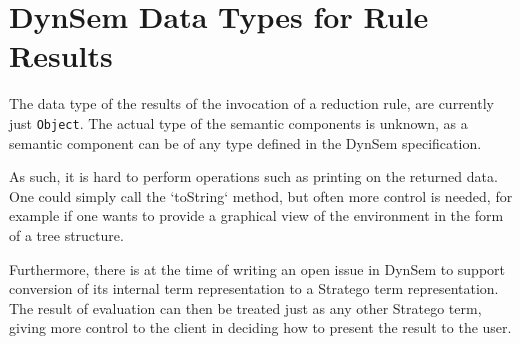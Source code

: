 \section{DynSem Data Types for Rule Results}
\label{sec:dynsem-data-repr}
The data type of the results of the invocation of a reduction rule, are
currently just \texttt{Object}. The actual type of the semantic components is
unknown, as a semantic component can be of any type defined in the DynSem
specification.

As such, it is hard to perform operations such as printing on the returned
data. One could simply call the `toString` method, but often more control is
needed, for example if one wants to provide a graphical view of the environment
in the form of a tree structure.

Furthermore, there is at the time of writing an open issue in DynSem to support
conversion of its internal term representation to a Stratego term
representation. The result of evaluation can then be treated just as any other
Stratego term, giving more control to the client in deciding how to present the
result to the user.

